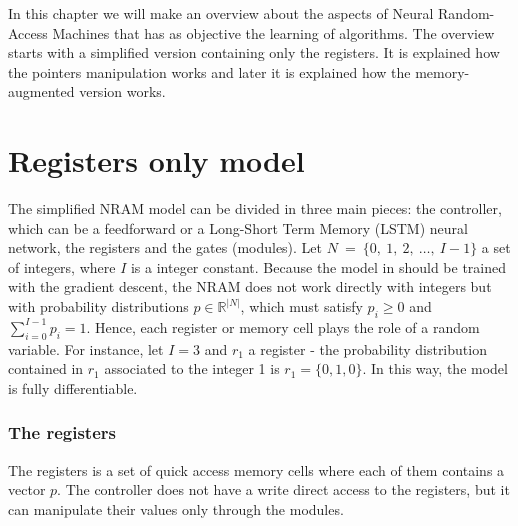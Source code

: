 \label{chap:nram}
In this chapter we will make an overview about the aspects of Neural Random-Access Machines \cite{NRAM:2016} that has as objective the learning of algorithms. The overview starts with a simplified version containing only the registers. It is explained how the pointers manipulation works and later it is explained how the memory-augmented version works.

\section{Registers only model}
The simplified NRAM model can be divided in three main pieces: the controller, which can be a feedforward or a Long-Short Term Memory (LSTM) neural network, the registers and the gates (modules). \newline \newline 
Let $N\ =\ \{0,\ 1,\ 2,\ \dots,\ I - 1\}$ a set of integers, where $I$ is a integer constant. Because the model in \cite{NRAM:2016} should be trained with the gradient descent, the NRAM does not work directly with integers but with probability distributions $p \in \mathbb{R}^{|N|}$, which must satisfy $p_{i} \geq 0$ and $\sum\limits_{i = 0}^{I-1} p_{i} = 1$. Hence, each register or memory cell plays the role of a random variable. For instance, let $I = 3$ and $r_1$ a register - the probability distribution contained in $r_1$ associated to the integer 1 is $r_1 = \{0, 1, 0\}$. In this way, the model is fully differentiable.

\subsubsection*{The registers}
The registers is a set of quick access memory cells where each of them contains a vector $p$. The controller does not have a write direct access to the registers, but it can manipulate their values only through the modules.

